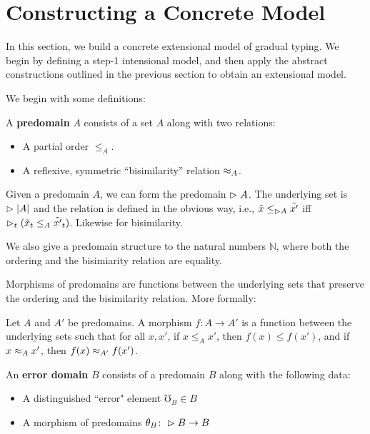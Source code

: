 \section{Constructing a Concrete Model}

In this section, we build a concrete extensional model of gradual typing.
We begin by defining a step-1 intensional model, and then
apply the abstract constructions outlined in the previous section
to obtain an extensional model.

We begin with some definitions:

\begin{definition}
A \textbf{predomain} $A$ consists of a set $A$ along with two relations:
\begin{itemize}
    \item A partial order $\le_A$.
    \item A reflexive, symmetric ``bisimilarity'' relation $\approx_A$.
\end{itemize}
\end{definition}

Given a predomain $A$, we can form the predomain $\vartriangleright A$.
The underlying set is $\vartriangleright |A|$ and the relation is defined in the obvious way,
i.e., $\tilde{x} \le_{\vartriangleright A} \tilde{x'}$ iff $\vartriangleright_t(\tilde{x}_t \le_A \tilde{x'}_t)$.
Likewise for bisimilarity.

We also give a predomain structure to the natural numbers $\mathbb{N}$, where both the
ordering and the bisimiarity relation are equality.

Morphisms of predomains are functions between the underlying sets that preserve the ordering
and the bisimilarity relation. More formally:
%
\begin{definition}
Let $A$ and $A'$ be predomains.
A morphism $f : A \to A'$ is a function between the underlying sets such that for all $x, x'$,
if $x \le_A x'$, then $f(x) \le f(x')$, and if $x \approx_A x'$, then $f(x) \approx_{A'} f(x')$.
\end{definition}

\begin{definition}
An \textbf{error domain} $B$ consists of a predomain $B$ along with the following data:
\begin{itemize}
    \item A distinguished ``error" element $\mho_B \in B$
    \item A morphism of predomains $\theta_B \colon \vartriangleright B \to B$
\end{itemize}
\end{definition}


